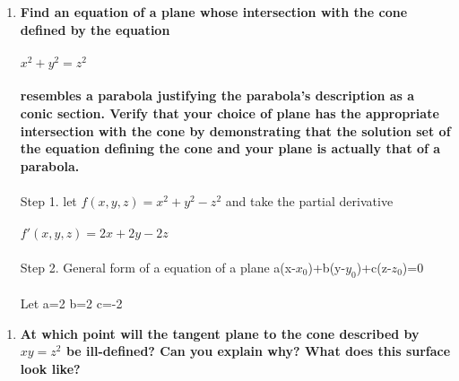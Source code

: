 \documentclass{article}
\begin{document}
\begin{enumerate}[10.]
\item\textbf{Find an equation of a plane whose intersection with the cone defined by the
equation\\\\$x^{2} + y^{2} = z^{2}$\\\\resembles a parabola justifying the parabola’s description as a conic section. Verify that your choice of plane has the appropriate intersection with the cone by demonstrating that the solution set of the equation defining the cone and your plane is actually that of a parabola.}\\
\\
Step 1. let $f(x,y,z)=x^{2} + y^{2}- z^{2}$ and take the partial derivative\\
\\
$f'(x,y,z)=2x+2y-2z$\\
\\
Step 2. General form of a equation of a plane a(x-$x_{0}$)+b(y-$y_{0}$)+c(z-$z_{0}$)=0\\
\\
Let a=2 b=2 c=-2
\end{enumerate}
\begin{enumerate}[11.]
\item\textbf{At which point will the tangent plane to the cone described by $xy = z^2$
be ill-defined? Can you explain why? What does this surface look like?}
\end{enumerate}
\end{document}
